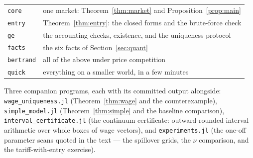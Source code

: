 \documentclass[11pt]{article}
\theoremstyle{plain}
\theoremstyle{remark}
\theoremstyle{definition}
\begin{document}
\begin{center}
\begin{tabular}{ll}
\toprule
\texttt{core} & one market: Theorem~\ref{thm:market} and Proposition~\ref{prop:main}\\
\texttt{entry} & Theorem~\ref{thm:entry}: the closed forms and the brute-force check\\
\texttt{ge} & the accounting checks, existence, and the uniqueness protocol\\
\texttt{facts} & the six facts of Section~\ref{sec:quant}\\
\texttt{bertrand} & all of the above under price competition\\
\texttt{quick} & everything on a smaller world, in a few minutes\\
\bottomrule
\end{tabular}
\end{center}

Three companion programs, each with its committed output alongside:
\texttt{wage\_uniqueness.jl} (Theorem~\ref{thm:wage} and the counterexample),
\texttt{simple\_model.jl} (Theorem~\ref{thm:simple} and the baseline comparison),
\texttt{interval\_certificate.jl} (the continuum certificate: outward-rounded
interval arithmetic over whole boxes of wage vectors), and
\texttt{experiments.jl} (the one-off parameter scans quoted in the text ---
the spillover grids, the $\nu$ comparison, and the tariff-with-entry exercise).
\end{document}
